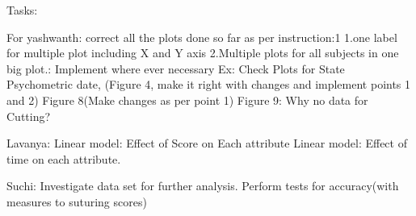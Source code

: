 Tasks:

For yashwanth:
correct all the plots done so far as per instruction:1
1.one label for multiple plot including X and Y axis 
2.Multiple plots for all subjects in one big plot.: Implement where ever necessary
Ex: Check Plots for State Psychometric date, (Figure 4, make it right with changes and implement points 1 and 2)
Figure 8(Make changes as per point 1)
Figure 9: Why no data for Cutting?

Lavanya:
Linear model: Effect of Score on Each attribute
Linear model: Effect of time on each attribute.

Suchi:
Investigate data set for further analysis.
Perform tests for accuracy(with measures to suturing scores)
